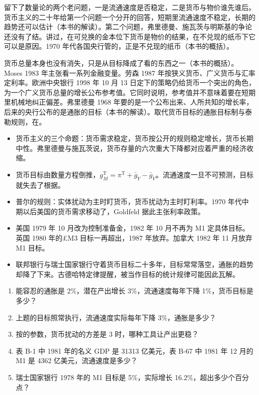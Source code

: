 留下了数量论的两个老问题，一是流通速度是否稳定，二是货币与物价谁先谁后。货币主义的二十年给第一个问题一个分开的回答，短期里流通速度不稳定，长期的趋势还可以估计（本书的解读）。第二个问题，弗里德曼、施瓦茨与明斯基的争论还没有了结。讲过，在可兑换的金本位下货币是物价的结果，在不兑现的纸币下它可以是原因。1970 年代各国央行管的，正是不兑现的纸币（本书的概括）。

货币总量本身也没有消失，只是从目标降成了看的东西之一（本书的概括）。Moses 1983 年主张看一系列金融变量\cite{moses1983}。劳森 1987 年按狭义货币、广义货币与汇率定利率\cite{hansard1987}。欧洲中央银行 1998 年 10 月 13 日定下的策略仍给货币一个突出的角色，为一个广义货币总量的增长公布参考值\cite{ecb1998}。它同时说明，参考值并不意味着要在短期里机械地纠正偏差\cite{ecb1998}。弗里德曼 1968 年要的是一个公布出来、人所共知的增长率，后来的央行公布的是通胀的目标（本书的解读）。取代货币目标的通胀目标制与泰勒规则，在。

\begin{takeaways}
\begin{itemize}
\item 货币主义的三个命题：货币需求稳定，货币按公开的规则稳定增长，货币长期中性。弗里德曼与施瓦茨说，货币存量的六次重大下降都对应着严重的经济收缩。
\item 货币目标由数量方程倒推，$g_M^{\mathrm{T}}=\pi^{\mathrm{T}}+\bar{g}_Y-\bar{g}_V$。流通速度一旦不可预测，目标就失去了根据。
\item 普尔的规则：实体扰动为主时盯货币，货币扰动为主时盯利率。1970 年代中期以后美国的货币需求移动了，Goldfeld 据此主张利率政策。
\item 美国 1979 年 10 月改为控制准备金，1982 年 10 月不再为 M1 定具体目标。英国 1980 年的£M3 目标一再超出，1987 年放弃。加拿大 1982 年 11 月放弃 M1 目标。
\item 联邦银行与瑞士国家银行守着货币目标二十多年，目标常常落空，通胀的趋势却降了下来。古德哈特定律提醒，被当作目标的统计规律可能因此瓦解。
\end{itemize}
\end{takeaways}

\begin{selfcheck}
\begin{enumerate}
\item 能容忍的通胀是 2\%，潜在产出增长 3\%，流通速度每年下降 1\%，货币目标是多少？
\item 上题的目标照常执行，流通速度实际每年下降 3\%，通胀是多少？
\item 按的参数，货币扰动的方差是 3 时，哪种工具让产出更稳？
\item 表 B-1 中 1981 年的名义 GDP 是 31313 亿美元，表 B-67 中 1981 年 12 月的 M1 是 4362 亿美元，流通速度是多少？
\item 瑞士国家银行 1978 年的 M1 目标是 5\%，实际增长 16.2\%，超出多少个百分点？
\end{enumerate}
\end{selfcheck}

